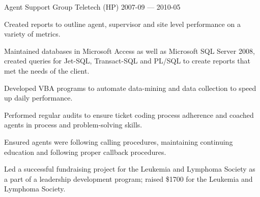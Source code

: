 \begin{cventries}
  \cventry
    {Agent Support Group} %
    {Teletech (HP)} %
    {} %
    {2007-09 — 2010-05} %
    {
      \begin{cvitems} %
        \item {Created reports to outline agent, supervisor and site level performance on a variety of metrics. }
        \item {Maintained databases in Microsoft Access as well as Microsoft SQL Server 2008, created queries for Jet-SQL, Transact-SQL and PL/SQL to create reports that met the needs of the client. }
        \item {Developed VBA programs to automate data-mining and data collection to speed up daily performance.}
        \item {Performed regular audits to ensure ticket coding process adherence and coached agents in process and problem-solving skills. }
        \item {Ensured agents were following calling procedures, maintaining continuing education and following proper callback procedures. }
        \item {Led a successful fundraising project for the Leukemia and Lymphoma Society as a part of a leadership development program; raised \$1700 for the Leukemia and Lymphoma Society.}
      \end{cvitems}
    }


\end{cventries}

